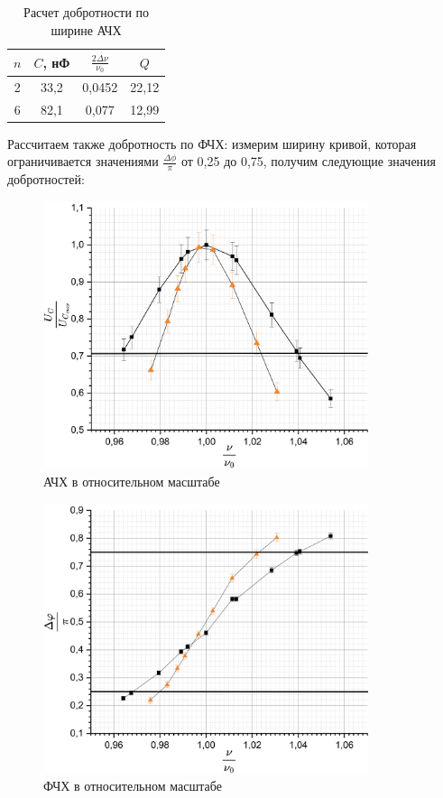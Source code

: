 \documentclass[a4paper, 12pt]{article}
\begin{document}
	\begin{table}[h]
		\centering
		\begin{tabular}{|c|c|c|c|}
			\hline
			$n$ & $C$, нФ & $\frac{2\Delta \nu}{\nu_0}$ & $Q$ \\ \hline
			2 & 33,2 & 0,0452 & 22,12 \\ \hline
			6 & 82,1 & 0,077 & 12,99 \\ \hline
		\end{tabular}
		\caption{Расчет добротности по ширине АЧХ}
	\end{table}

	Рассчитаем также добротность по ФЧХ: измерим ширину кривой, которая ограничивается значениями $\frac{\Delta \phi}{\pi}$ от 0,25 до 0,75, получим следующие значения добротностей:

	\begin{figure}[H]
		\centering
		\includegraphics[width = 0.85\textwidth, height = 0.44\textheight]{LinedAFCH}
		\caption{АЧХ в относительном масштабе}
	\end{figure}

	\begin{figure}[H]
		\centering
		\includegraphics[width = 0.85\textwidth, height = 0.44\textheight]{LinedPhFCH}
		\caption{ФЧХ в относительном масштабе}
	\end{figure}
\end{document}
